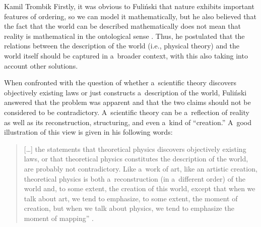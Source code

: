\begin{artengenv}{Kamil Trombik}
Firstly, it was obvious to Fuliński that nature exhibits important features of ordering, so we can model it mathematically, but he also believed that the fact that the world can be described mathematically does not mean that reality is mathematical in the ontological sense 
\parencites[][]{janik_glos_1988}[][]{janik_glos_1990}[][]{fulinski_o_1993}. %
 Thus, he postulated that the relations between the description of the world (i.e., physical theory) and the world itself should be captured in a~broader context, with this also taking into account other solutions.



When confronted with the question of whether a~scientific theory discovers objectively existing laws or just constructs a~description of the world, Fuliński answered that the problem was apparent and that the two claims should not be considered to be contradictory. A~scientific theory can be a~reflection of reality as well as its reconstruction, structuring, and even a~kind of ``creation.'' A~good illustration of this view is given in his following words:



\begin{quote}
[…] the statements that theoretical physics discovers objectively existing laws, or that theoretical physics constitutes the description of the world, are probably not contradictory. Like a~work of art, like an artistic creation, theoretical physics is both a~reconstruction (in a~different order) of the world and, to some extent, the creation of this world, except that when we talk about art, we tend to emphasize, to some extent, the moment of creation, but when we talk about physics, we tend to emphasize the moment of mapping''
\parencite[][p.221]{janik_o_1988}.%
\end{quote}





\end{artengenv}
